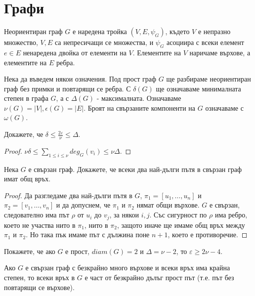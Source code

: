 \chapter{Графи}
\label{chap:graph}


\begin{dfn}
  Неориентиран граф $G$ е наредена тройка $(V,E,\psi_G)$, където
  $V$ е непразно множество, $V,E$ са непресичащи се множества, и $\psi_G$ асоциира с всеки елемент $e\in E$
  ненаредена двойка от елементи на $V$.
  Елементите на $V$ наричаме върхове, а елементите на $E$ ребра.
\end{dfn}

Нека да въведем някои означения.
Под прост граф $G$ ще разбираме неориентиран граф без примки и повтарящи се ребра.
С $\delta(G)$ ще означаваме минималната степен в графа $G$, а с $\Delta(G)$ - максималната.
Означаваме $\nu(G) = |V|, \epsilon(G) = |E|$.
Броят на свързаните компоненти на $G$ означаваме с $\omega(G)$.

\begin{problem}
  Докажете, че $\delta \leq \frac{2\varepsilon}{\nu} \leq \Delta$.
\end{problem}
\begin{proof}
  $\nu\delta \leq\sum_{1\leq i \leq\nu} deg_G(v_i) \leq \nu\Delta$.
\end{proof}

\begin{problem}
  Нека $G$ е свързан граф.
  Докажете, че всеки два най-дълги пътя в свързан граф имат общ връх.
\end{problem}
\begin{proof}
  Да разгледаме два най-дълги пътя в $G$, $\pi_1 = [u_1,\dots,u_n]$ и $\pi_2 = [v_1,\dots,v_n]$ и да допуснем, че $\pi_1$ и $\pi_2$
  нямат общи върхове.
  $G$ е свързан, следователно има път $\rho$ от $u_i$ до $v_j$, за някои $i,j$.
  Със сигурност по $\rho$ има ребро, което не участва нито в $\pi_1$, нито в $\pi_2$, защото иначе ще имаме общ връх между $\pi_1$ и $\pi_2$.
  Но така пък имаме път с дължина поне $n+1$, което е противоречие.
\end{proof}

\begin{problem}%
  Покажете, че ако $G$ е прост, $diam(G) = 2$ и $\Delta = \nu - 2$, то $\varepsilon \geq 2\nu - 4$.
\end{problem}

\begin{lemma}
  Ако $G$ е свързан граф с безкрайно много върхове и всеки връх има крайна степен, то всеки връх в $G$ е част от 
  безкрайно дълъг прост път (т.е. път без повтарящи се върхове).
\end{lemma}


